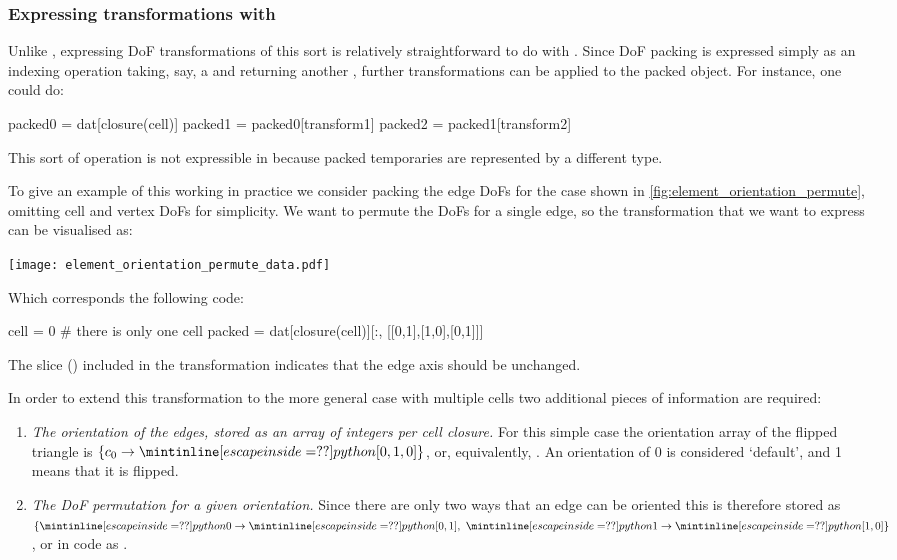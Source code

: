\documentclass[thesis]{subfiles}
\begin{document}
\subsubsection{Expressing transformations with }


Unlike , expressing DoF transformations of this sort is relatively straightforward to do with .
Since DoF packing is expressed simply as an indexing operation taking, say, a  and returning another , further transformations can be applied to the packed object.
For instance, one could do:
\begin{pyinline}
  packed0 = dat[closure(cell)]
  packed1 = packed0[transform1]
  packed2 = packed1[transform2]
\end{pyinline}
This sort of operation is not expressible in  because packed temporaries are represented by a different type.

To give an example of this working in practice we consider packing the edge DoFs for the case shown in \cref{fig:element_orientation_permute}, omitting cell and vertex DoFs for simplicity.
We want to permute the DoFs for a single edge, so the transformation that we want to express can be visualised as:
\begin{center}
  \texttt{[image: element\_orientation\_permute\_data.pdf]}
\end{center}
Which corresponds the following  code:
\begin{pyinline}
  cell = 0  # there is only one cell
  packed = dat[closure(cell)][:, [[0,1],[1,0],[0,1]]]
\end{pyinline}
The slice (\pycode{:}) included in the transformation indicates that the edge axis should be unchanged.

In order to extend this transformation to the more general case with multiple cells two additional pieces of information are required:
\begin{enumerate}
  \item
    \emph{The orientation of the edges, stored as an array of integers per cell closure.}
    For this simple case the orientation array of the flipped triangle is $\{ c_0 \to \pycode{[0,1,0]} \}$, or, equivalently, .
    An orientation of 0 is considered `default', and 1 means that it is flipped.

  \item
    \emph{The DoF permutation for a given orientation.}
    Since there are only two ways that an edge can be oriented this is therefore stored as $\{ \pycode{0} \to \pycode{[0,1]},\ \pycode{1} \to \pycode{[1,0]} \}$, or in code as .
\end{enumerate}
\end{document}
